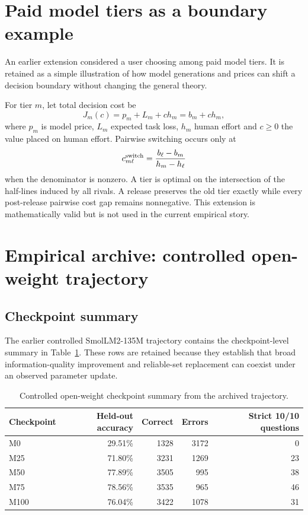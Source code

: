 \documentclass[11pt,letterpaper]{article}
\theoremstyle{plain}
\newcommand{\1}{\mathbf 1}
\begin{document}
\section{Paid model tiers as a boundary example}
An earlier extension considered a user choosing among paid model tiers. It is retained as a simple illustration of how model generations and prices can shift a decision boundary without changing the general theory.

For tier $m$, let total decision cost be
\begin{equation}
 J_m(c)=p_m+L_m+c h_m=b_m+c h_m,
\label{eq:s_tier_cost}
\end{equation}
where $p_m$ is model price, $L_m$ expected task loss, $h_m$ human effort and $c\ge0$ the value placed on human effort. Pairwise switching occurs only at
\begin{equation}
 c_{m\ell}^{\rm switch}=\frac{b_\ell-b_m}{h_m-h_\ell}
\label{eq:s_tier_switch}
\end{equation}
when the denominator is nonzero. A tier is optimal on the intersection of the half-lines induced by all rivals. A release preserves the old tier exactly while every post-release pairwise cost gap remains nonnegative. This extension is mathematically valid but is not used in the current empirical story.

\section{Empirical archive: controlled open-weight trajectory}
\subsection{Checkpoint summary}
The earlier controlled SmolLM2-135M trajectory contains the checkpoint-level summary in Table~\ref{tab:s_checkpoint_archive}. These rows are retained because they establish that broad information-quality improvement and reliable-set replacement can coexist under an observed parameter update.
\begin{table}[H]
\centering
\caption{Controlled open-weight checkpoint summary from the archived trajectory.}
\label{tab:s_checkpoint_archive}
\begin{tabular}{lrrrr}
\toprule
Checkpoint & Held-out accuracy & Correct & Errors & Strict 10/10 questions\\
\midrule
M0 & 29.51\% & 1328 & 3172 & 0\\
M25 & 71.80\% & 3231 & 1269 & 23\\
M50 & 77.89\% & 3505 & 995 & 38\\
M75 & 78.56\% & 3535 & 965 & 46\\
M100 & 76.04\% & 3422 & 1078 & 31\\
\bottomrule
\end{tabular}
\end{table}
\end{document}
